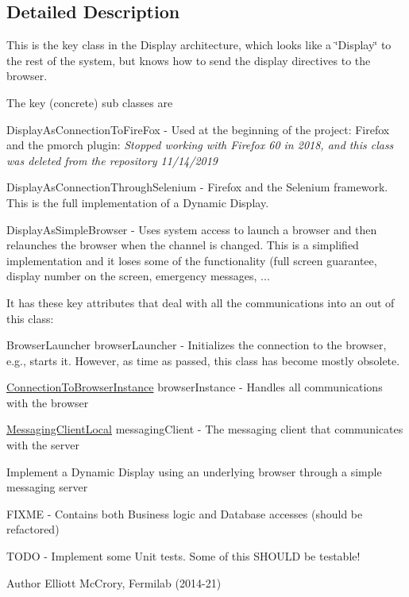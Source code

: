 \subsection{Detailed Description}
This is the key class in the Display architecture, which looks like a \char`\"{}\-Display\char`\"{} to the rest of the system, but knows how to send the display directives to the browser. 

The key (concrete) sub classes are 
\begin{DoxyItemize}
\item Display\-As\-Connection\-To\-Fire\-Fox -\/ Used at the beginning of the project\-: Firefox and the pmorch plugin\-: {\itshape Stopped working with Firefox 60 in 2018, and this class was deleted from the repository 11/14/2019} 
\item Display\-As\-Connection\-Through\-Selenium -\/ Firefox and the Selenium framework. This is the full implementation of a Dynamic Display. 
\item Display\-As\-Simple\-Browser -\/ Uses system access to launch a browser and then relaunches the browser when the channel is changed. This is a simplified implementation and it loses some of the functionality (full screen guarantee, display number on the screen, emergency messages, ... 





It has these key attributes that deal with all the communications into an out of this class\-: 
\begin{DoxyEnumerate}
\item Browser\-Launcher browser\-Launcher -\/ Initializes the connection to the browser, e.\-g., starts it. However, as time as passed, this class has become mostly obsolete. 
\item \hyperlink{classgov_1_1fnal_1_1ppd_1_1dd_1_1display_1_1client_1_1ConnectionToBrowserInstance}{Connection\-To\-Browser\-Instance} browser\-Instance -\/ Handles all communications with the browser 
\item \hyperlink{classgov_1_1fnal_1_1ppd_1_1dd_1_1display_1_1client_1_1DisplayControllerMessagingAbstract_1_1MessagingClientLocal}{Messaging\-Client\-Local} messaging\-Client -\/ The messaging client that communicates with the server 
\end{DoxyEnumerate}



Implement a Dynamic Display using an underlying browser through a simple messaging server

F\-I\-X\-M\-E -\/ Contains both Business logic and Database accesses (should be refactored)

T\-O\-D\-O -\/ Implement some Unit tests. Some of this S\-H\-O\-U\-L\-D be testable!

\begin{DoxyAuthor}{Author}
Elliott Mc\-Crory, Fermilab (2014-\/21) 
\end{DoxyAuthor}

\end{DoxyItemize}

